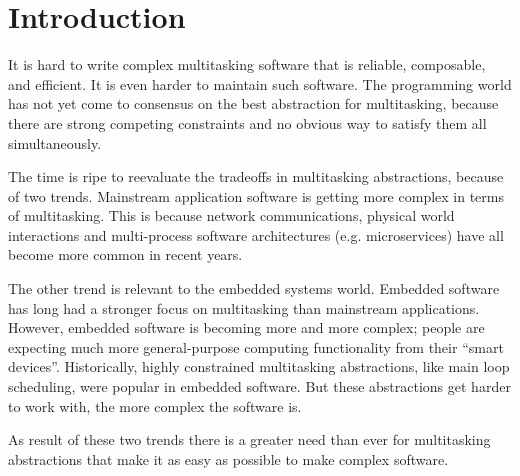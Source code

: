 \documentclass[9pt,preprint]{sigplanconf-2}
\begin{document}




\section{Introduction}

It is hard to write complex multitasking software that is reliable, composable, and efficient.
It is even harder to maintain such software.
The programming world has not yet come to consensus on the best abstraction for multitasking, because there are strong competing constraints and no obvious way to satisfy them all simultaneously.

The time is ripe to reevaluate the tradeoffs in multitasking abstractions, because of two trends.
Mainstream application software is getting more complex in terms of multitasking.
This is because network communications, physical world interactions and multi-process software architectures (e.g. microservices) have all become more common in recent years.

The other trend is relevant to the embedded systems world.
Embedded software has long had a stronger focus on multitasking than mainstream applications.
However, embedded software is becoming more and more complex; people are expecting much more general-purpose computing functionality from their ``smart devices''.
Historically, highly constrained multitasking abstractions, like main loop scheduling, were popular in embedded software.
But these abstractions get harder to work with, the more complex the software is.

As result of these two trends there is a greater need than ever for multitasking abstractions that make it as easy as possible to make complex software.

\end{document}
